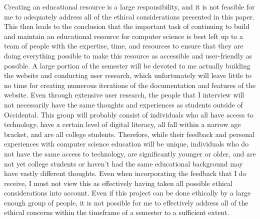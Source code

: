 \documentclass[10pt,twocolumn]{article}
\begin{document}
Creating an educational resource is a large responsibility, and it is not feasible for me to adequately address all of the ethical considerations presented in this paper. This then leads to the conclusion that the important task of continuing to build and maintain an educational resource for computer science is best left up to a team of people with the expertise, time, and resources to ensure that they are doing everything possible to make this resource as accessible and user-friendly as possible. A large portion of the semester will be devoted to me actually building the website and conducting user research, which unfortunately will leave little to no time for creating numerous iterations of the documentation and features of the website. Even through extensive user research, the people that I interview will not necessarily have the same thoughts and experiences as students outside of Occidental. This group will probably consist of individuals who all have access to technology, have a certain level of digital literacy, all fall within a narrow age bracket, and are all college students. Therefore, while their feedback and personal experiences with computer science education will be unique, individuals who do not have the same access to technology, are significantly younger or older, and are not yet college students or haven’t had the same educational background may have vastly different thoughts. Even when incorporating the feedback that I do receive, I must not view this as effectively having taken all possible ethical considerations into account. Even if this project can be done ethically by a large enough group of people, it is not possible for me to effectively address all of the ethical concerns within the timeframe of a semester to a sufficient extent.  

\printbibliography
\end{document}
